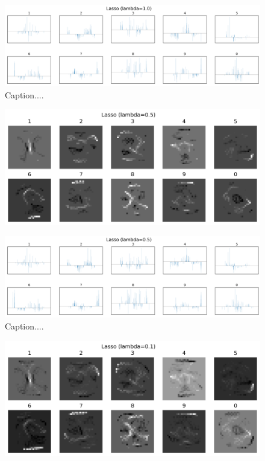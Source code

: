 \documentclass[10pt]{article}
\begin{document}
\begin{figure}[ht]
\centerline{\includegraphics[scale=0.5]{figures/bar_plot_loadings_lasso_1.png}}
\caption{Caption....}
\label{fig5b}
\end{figure}

\begin{figure}[ht]
\centerline{\includegraphics[scale=0.8]{figures/weight_matrix_lasso_05.png}}
\label{fig6a}
\end{figure}

\begin{figure}[ht]
\centerline{\includegraphics[scale=0.5]{figures/bar_plot_loadings_lasso_05.png}}
\caption{Caption....}
\label{fig6b}
\end{figure}

\begin{figure}[ht]
\centerline{\includegraphics[scale=0.8]{figures/weight_matrix_lasso_01.png}}
\label{fig7a}
\end{figure}
\end{document}
